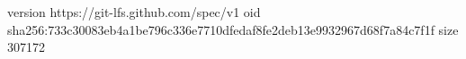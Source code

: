 version https://git-lfs.github.com/spec/v1
oid sha256:733c30083eb4a1be796c336e7710dfedaf8fe2deb13e9932967d68f7a84c7f1f
size 307172
